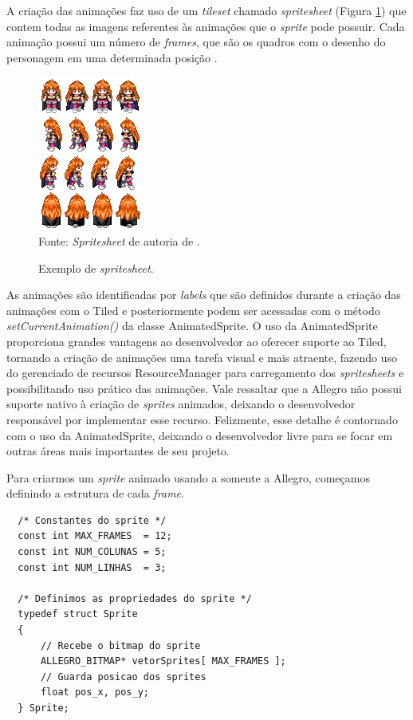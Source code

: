 %
%
\par
A criação das animações faz uso de um \textit{tileset} chamado \textit{spritesheet} (Figura \ref{sprite}) que contem todas as imagens referentes às animações que o \textit{sprite} pode possuir. Cada animação possui um número de \textit{frames}, que são os quadros com o desenho do personagem em uma determinada posição \cite{GEDIGames}.
%
%
%
\begin{figure}[H]
    \centering
    \caption{Exemplo de \textit{spritesheet}.}
    \label{sprite}
    \includegraphics[scale = 1]{Imagens/sprite.png}
    \\Fonte: \textit{Spritesheet} de autoria de \cite{Sithjester}.
\end{figure}
%
%
\par 
As animações são identificadas por \textit{labels} que são definidos durante a criação das animações com o Tiled e posteriormente podem ser acessadas com o método \textit{setCurrentAnimation()} da classe AnimatedSprite. O uso da AnimatedSprite proporciona grandes vantagens ao desenvolvedor ao oferecer suporte ao Tiled, tornando a criação de animações uma tarefa visual e mais atraente, fazendo uso do gerenciado de recursos ResourceManager para carregamento dos \textit{spritesheets} e possibilitando uso prático das animações. Vale ressaltar que a Allegro não possui suporte nativo à criação de \textit{sprites} animados, deixando o desenvolvedor responsável por implementar esse recurso. Felizmente, esse detalhe é contornado com o uso da AnimatedSprite, deixando o desenvolvedor livre para se focar em outras áreas mais importantes de seu projeto.
%
\par 
Para criarmos um \textit{sprite} animado usando a somente a Allegro, começamos definindo a estrutura de cada \textit{frame}.
%
\begin{lstlisting}
  /* Constantes do sprite */
  const int MAX_FRAMES  = 12;
  const int NUM_COLUNAS = 5;
  const int NUM_LINHAS  = 3;
  
  /* Definimos as propriedades do sprite */
  typedef struct Sprite
  {
      // Recebe o bitmap do sprite
      ALLEGRO_BITMAP* vetorSprites[ MAX_FRAMES ];
      // Guarda posicao dos sprites
      float pos_x, pos_y;
  } Sprite;
\end{lstlisting}
